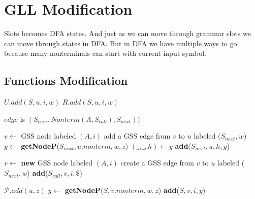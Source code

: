 \documentclass[runningheads,a4paper]{llncs}
\begin{document}
\section{GLL Modification}%
Slots becomes DFA states. And just as we can move through grammar slots we can move through states 
in DFA. But in DFA we have multiple ways to go because many nonterminals can start with current input symbol. 


\subsection{Functions Modification}
\begin{algorithmic}
    \State $U.add(S,u,i,w)$
    \State $R.add(S,u,i,w)$
    \EndIf
    \EndFunction
\end{algorithmic}

\begin{algorithmic}    
    \State $edge$ is $(S_{curr}, Nonterm(A, S_{call}), S_{next}))$
    
        \State $v \gets$ GSS node labeled $(A, i)$
            \State add a GSS edge from $v$ to $u$ labeled ($S_{next},w$)
                \State $y \gets$ \textbf{getNodeP}($S_{next}, u.nonterm, w, z$)
                \State $(\_, \_, h) \gets y$
                \State \textbf{add}($S_{next} , u, h, y$)
            \EndFor
        \EndIf
    
    \Else
        \State $v \gets$ \textbf{new} GSS node labeled $(A, i)$
        \State create a GSS edge from $v$ to $u$ labeled ($S_{next}, w$)
        \State \textbf{add}($S_{call}, v, i, \$ $)
    \EndIf
\EndFunction
\end{algorithmic}  

\begin{algorithmic}   
        \State $\mathcal{P}.add(u,z)$
            \State $y \gets$ \textbf{getNodeP}($S, v.nonterm, w, z$)
            \State \textbf{add}($S,v,i,y$)
        \EndFor
    \EndIf
\EndFunction
\end{algorithmic}
\end{document}
